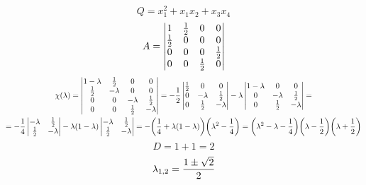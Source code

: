 $$ Q = x_1^2 + x_1x_2 + x_3x_4 $$
$$ A =
\begin{vmatrix}
	1 & \half & 0 & 0 \\
    \half & 0 & 0 & 0 \\
    0 & 0 & 0 & \half \\
    0 & 0 & \half & 0
\end{vmatrix} $$
\begin{multline*}
    \chi(\lambda) =
    \begin{vmatrix}
        1 - \lambda & \half & 0 & 0 \\
        \half & -\lambda & 0 & 0 \\
        0 & 0 & -\lambda & \half \\
        0 & 0 & \half & -\lambda
    \end{vmatrix} = -\half
    \begin{vmatrix}
    	\half & 0 & 0 \\
        0 & -\lambda & \half \\
        0 & \half & -\lambda
    \end{vmatrix} - \lambda
    \begin{vmatrix}
    	1 - \lambda & 0 & 0 \\
        0 & - \lambda & \half \\
        0 & \half & -\lambda
    \end{vmatrix} = \\
    = -\frac14
    \begin{vmatrix}
    	-\lambda & \half \\
        \half & -\lambda
    \end{vmatrix} - \lambda(1 - \lambda)
    \begin{vmatrix}
    	-\lambda & \half \\
        \half & -\lambda
    \end{vmatrix} = - \bigg( \frac14 + \lambda(1 - \lambda) \bigg) \bigg( \lambda^2 - \frac14 \bigg) = \bigg( \lambda^2 - \lambda - \frac14 \bigg) \bigg( \lambda - \half \bigg) \bigg( \lambda + \half \bigg)
\end{multline*}
$$ D = 1 + 1 = 2 $$
$$ \lambda_{1,2} = \half[1 \pm \sqrt2] $$

